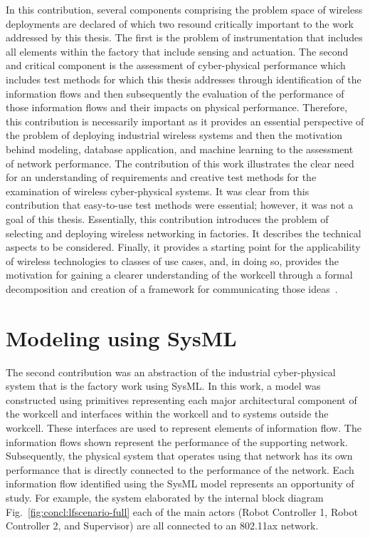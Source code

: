 In this contribution, several components comprising the problem space of wireless deployments are declared of which two resound critically important to the work addressed by this thesis.  The first is the problem of instrumentation that includes all elements within the factory that include sensing and actuation.  The second and critical component is the assessment of cyber-physical performance which includes test methods for which this thesis addresses through identification of the information flows and then subsequently the evaluation of the performance of those information flows and their impacts on physical performance.  Therefore, this contribution is necessarily important as it provides an essential perspective of the problem of deploying industrial wireless systems and then the motivation behind modeling, database application, and machine learning to the assessment of network performance.  The contribution of this work illustrates the clear need for an understanding of requirements and creative test methods for the examination of wireless cyber-physical systems.  It was clear from this contribution that easy-to-use test methods were essential; however, it was not a goal of this thesis.  Essentially, this contribution introduces the problem of selecting and deploying wireless networking in factories.  It describes the technical aspects to be considered.  Finally, it provides a starting point for the applicability of wireless technologies to classes of use cases, and, in doing so, provides the motivation for gaining a clearer understanding of the workcell through a formal decomposition and creation of a framework for communicating those ideas~\cite{CandellISIT2020.Conf}.

\section{Modeling using SysML}
The second contribution was an abstraction of the industrial cyber-physical system that is the factory work using SysML.  In this work, a model was constructed using primitives representing each major architectural component of the workcell and interfaces within the workcell and to systems outside the workcell.  These interfaces are used to represent elements of information flow.  The information flows shown represent the performance of the supporting network.  Subsequently, the physical system that operates using that network has its own performance that is directly connected to the performance of the network.  Each information flow identified using the SysML model represents an opportunity of study.  For example, the system elaborated by the internal block diagram Fig.~\ref{fig:concl:lfscenario-full} each of the main actors (Robot Controller 1, Robot Controller 2, and Supervisor) are all connected to an 802.11ax network.

